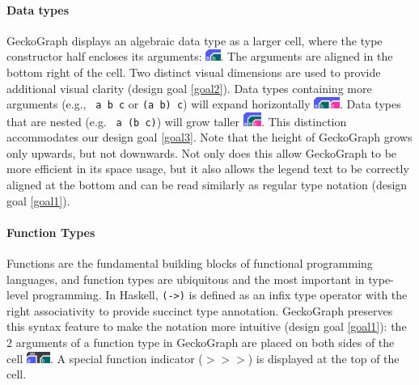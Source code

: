\paragraph{Data types}
GeckoGraph displays an algebraic data type as a larger cell, where the type constructor half encloses its arguments: \includegraphics[height=1em]{figures/DataType.png}. The arguments are aligned in the bottom right of the cell. Two distinct visual dimensions are used to provide additional visual clarity (design goal \ref{goal2}). Data types containing more arguments (e.g., \texttt{ a b c} or \texttt{(a b) c}) will expand horizontally \includegraphics[height=1em]{figures/DataTypeWide.png}. Data types that are nested (e.g. \texttt{ a (b c)}) will grow taller \includegraphics[height=1.2em]{figures/DataTypeNested.png}. This distinction accommodates our design goal \ref{goal3}. Note that the height of GeckoGraph grows only upwards, but not downwards. Not only does this allow GeckoGraph to be more efficient in its space usage, but it also allows the legend text to be correctly aligned at the bottom and can be read similarly as regular type notation (design goal \ref{goal1}).  



\paragraph{Function Types}
Functions are the fundamental building blocks of functional programming languages, and function types are ubiquitous and the most important in type-level programming. In Haskell, \texttt{(->)} is defined as an infix type operator with the right associativity to provide succinct type annotation. GeckoGraph preserves this syntax feature to make the notation more intuitive (design goal \ref{goal1}): the 2 arguments of a function type in GeckoGraph are placed on both sides of the cell \includegraphics[height=1em]{figures/Function.png}. A special function indicator (\texttt{$>>>$}) is displayed at the top of the cell. 


